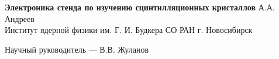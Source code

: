 \documentclass[10pt,a5paper]{scrartcl}
\begin{document}
    \begin{center}
        \textbf{Электроника стенда по изучению сцинтилляционных кристаллов}
        \bigbreak
        А.А. Андреев \\
        Институт ядерной физики им. Г. И. Будкера СО РАН г. Новосибирск
    \end{center}

\bigbreak
\begin{center}
    Научный руководитель --- В.В. Жуланов 
\end{center} 
\end{document}
